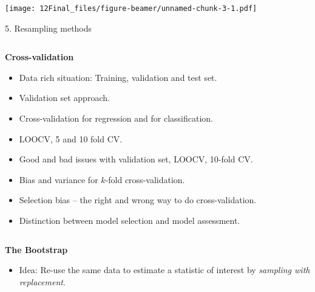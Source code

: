 \documentclass[10pt,ignorenonframetext,]{beamer}
\providecommand{\tightlist}{%
  \setlength{\itemsep}{0pt}\setlength{\parskip}{0pt}}
\begin{document}
\begin{frame}

\texttt{[image: 12Final\_files/figure-beamer/unnamed-chunk-3-1.pdf]}

\end{frame}

\begin{frame}

\begin{block}{5. Resampling methods}

\(~\)

\textbf{Cross-validation}

\vspace{2mm}

\begin{itemize}
\item
  Data rich situation: Training, validation and test set. \vspace{2mm}
\item
  Validation set approach. \vspace{2mm}
\item
  Cross-validation for regression and for classification. \vspace{2mm}
\item
  LOOCV, 5 and 10 fold CV. \vspace{2mm}
\item
  Good and bad issues with validation set, LOOCV, 10-fold CV.
  \vspace{2mm}
\item
  Bias and variance for \(k\)-fold cross-validation. \vspace{2mm}
\item
  Selection bias -- the right and wrong way to do cross-validation.
  \vspace{2mm}
\item
  Distinction between model selection and model assessment.
\end{itemize}

\(~\)

\textbf{The Bootstrap}

\begin{itemize}
\tightlist
\item
  Idea: Re-use the same data to estimate a statistic of interest by
  \emph{sampling with replacement}.
\end{itemize}

\end{block}

\end{frame}
\end{document}
